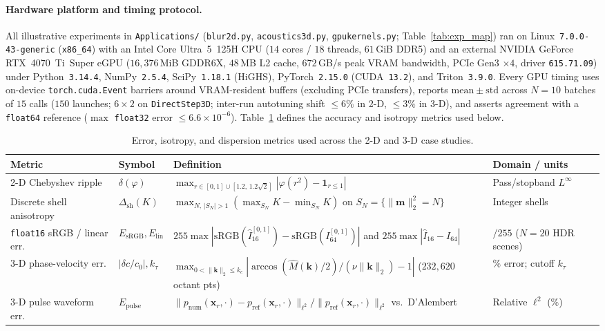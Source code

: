 \documentclass[11pt,a4paper]{article}
\theoremstyle{plain}
\theoremstyle{definition}
\DeclareRobustCommand{\leanid}[1]{{\def\_{\textunderscore\allowbreak}\texttt{#1}}}
\begin{document}
\paragraph{Hardware platform and timing protocol.}
All illustrative experiments in \texttt{Applications/} (\leanid{blur\_2d.py}, \leanid{acoustics\_3d.py}, \leanid{gpu\_kernels.py}; Table~\ref{tab:exp_map}) ran on Linux~\texttt{7.0.0-43-generic} (\texttt{x86\_64}) with an Intel Core Ultra~5~125H CPU ($14$ cores / $18$ threads, $61$\,GiB DDR5) and an external NVIDIA GeForce RTX~4070~Ti~Super eGPU ($16{,}376$\,MiB GDDR6X, $48$\,MB L2 cache, $672$\,GB/s peak VRAM bandwidth, PCIe Gen3 $\times 4$, driver \texttt{615.71.09}) under Python~\texttt{3.14.4}, NumPy~\texttt{2.5.4}, SciPy~\texttt{1.18.1} (HiGHS), PyTorch~\texttt{2.15.0} (CUDA~\texttt{13.2}), and Triton~\texttt{3.9.0}. Every GPU timing uses on-device \texttt{torch.cuda.Event} barriers around VRAM-resident buffers (excluding PCIe transfers), reports $\mathrm{mean} \pm \mathrm{std}$ across $N = 10$ batches of $15$ calls ($150$ launches; $6 \times 2$ on \texttt{DirectStep3D}; inter-run autotuning shift $\le 6\%$ in 2-D, $\le 3\%$ in 3-D), and asserts agreement with a \texttt{float64} reference ($\max$ \texttt{float32} error $\le 6.6 \times 10^{-6}$). Table~\ref{tab:metrics} defines the accuracy and isotropy metrics used below.

\begin{table}[t]
\centering
\caption{Error, isotropy, and dispersion metrics used across the 2-D and 3-D case studies.}\label{tab:metrics}
\smallskip
{\scriptsize\setlength{\tabcolsep}{2.8pt}
\begin{tabular}{@{}ll>{\raggedright\arraybackslash}p{6.6cm}l@{}}
\toprule
Metric & Symbol & Definition & Domain / units \\
\midrule
2-D Chebyshev ripple & $\delta(\varphi)$ & $\max_{r \in [0,1] \cup [1.2,\,1.2\sqrt{2}]} |\varphi(r^2) - \mathbf{1}_{r \le 1}|$ & Pass/stopband $L^\infty$ \\
Discrete shell anisotropy & $\Delta_{\mathrm{sh}}(K)$ & $\max_{N,\,|S_N|>1}(\max_{S_N} K - \min_{S_N} K)$ on $S_N = \{\|\mathbf{m}\|_2^2 = N\}$ & Integer shells \\
\texttt{float16} sRGB / linear err. & $E_{\mathrm{sRGB}}, E_{\mathrm{lin}}$ & $255\max|\mathrm{sRGB}(\hat{I}_{16}^{[0,1]}) - \mathrm{sRGB}(I_{64}^{[0,1]})|$ and $255\max|\hat{I}_{16} - I_{64}|$ & $/255$ ($N{=}20$ HDR scenes) \\
3-D phase-velocity err. & $|\delta c/c_0|, k_\tau$ & $\max_{0 < \|\mathbf{k}\|_2 \le k_c} |\arccos(\widehat{M}(\mathbf{k})/2)/(\nu\|\mathbf{k}\|_2) - 1|$ ($232{,}620$ octant pts) & $\%$ error; cutoff $k_\tau$ \\
3-D pulse waveform err. & $E_{\mathrm{pulse}}$ & $\|p_{\mathrm{num}}(\mathbf{x}_r,\cdot) - p_{\mathrm{ref}}(\mathbf{x}_r,\cdot)\|_{\ell^2} / \|p_{\mathrm{ref}}(\mathbf{x}_r,\cdot)\|_{\ell^2}$ vs.\ D'Alembert & Relative $\ell^2$ ($\%$) \\
\bottomrule
\end{tabular}}
\end{table}
\end{document}

